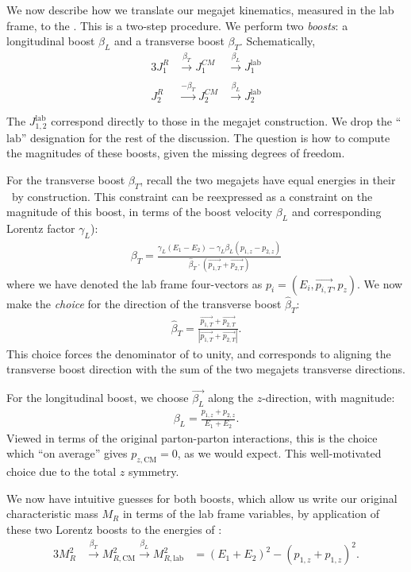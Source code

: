 We now describe how we translate our megajet kinematics, measured in the lab frame, to the \rframe.
This is a two-step procedure.
We perform two \textit{boosts}: a longitudinal boost $\beta_L$ and a transverse boost $\beta_T$.
Schematically,
\begin{alignat}{3}
J_1^R & \xrightarrow[]{ \beta_T} J_1^{CM} & \xrightarrow[]{\beta_L} J_1^{\text{lab}} \\
J_2^R & \xrightarrow[]{-\beta_T} J_2^{CM} & \xrightarrow[]{\beta_L} J_2^{\text{lab}} \\
\end{alignat}
The $J_{1,2}^{\text{lab}}$ correspond directly to those in the megajet construction.
We drop the ``$\text{lab}$'' designation for the rest of the discussion.
The question is how to compute the magnitudes of these boosts, given the missing degrees of freedom.

For the transverse boost $\beta_T$, recall the two megajets have equal energies in their \rframe~by construction.
This constraint can be reexpressed as a constraint on the magnitude of this boost, in terms of the boost velocity $\beta_L$ and corresponding Lorentz factor $\gamma_L$):
\begin{align}\label{eq:beta_t}
\beta_T = \frac{ \gamma_L (E_1 - E_2) - \gamma_L \beta_L (p_{1,z} - p_{2,z})}
               { \hat{\beta}_T \cdot (\vec{p_{1,T}} + \vec{p_{2,T}} )}
\end{align}
where we have denoted the lab frame four-vectors as  $p_i = (E_i , \vec{p_{i,T}} , p_z)$.
We now make the \textit{choice} for the direction of the transverse boost $\hat{\beta}_T$:
\begin{align}
\hat{\beta}_T =  \frac{\vec{p_{1,T}} +  \vec{p_{2,T}}}{ | \vec{p_{1,T}} +  \vec{p_{2,T}}  | }.
\end{align}
This choice forces the denominator of  to unity, and corresponds to aligning the transverse boost direction with the sum of the two megajets transverse directions.

For the longitudinal boost, we choose $\vec{\beta_L}$ along the $z$-direction, with magnitude:
\begin{align} \label{eq:beta_l}
\beta_L = \frac{p_{1,z} + p_{2,z}}{E_1+E_2}.
\end{align}
Viewed in terms of the original parton-parton interactions, this is the choice which ``on average'' gives $p_{z,\text{CM}} = 0$, as we would expect.
This well-motivated choice due to the total $z$ symmetry.

We now have intuitive guesses for both boosts, which allow us write our original characteristic mass $M_R$ in terms of the lab frame variables, by application of these two Lorentz boosts to the energies of :
\begin{alignat}{3}
M_R^2 &\xrightarrow[]{\beta_T } M_{R,\text{CM}}^{2} \xrightarrow[]{\beta_L } M_{R,\text{lab}}^{2}
      &=(E_1 + E_2)^2 - (p_{1,z} + p_{1,z})^2.
\end{alignat}

